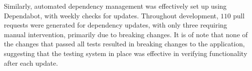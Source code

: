 Similarly, automated dependency management was effectively set up using Dependabot, with weekly checks for updates. Throughout development, $110$ pull requests were generated for dependency updates, with only three requiring manual intervention, primarily due to breaking changes. It is of note that none of the changes that passed all tests resulted in breaking changes to the application, suggesting that the testing system in place was effective in verifying functionality after each update.
